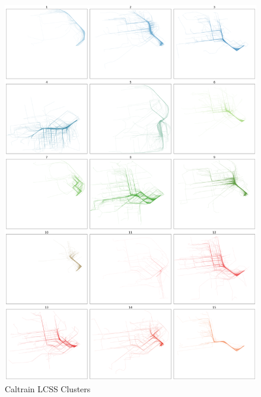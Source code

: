 \documentclass[a4paper, 12pt]{article}
\begin{document}
\begin{figure}[htbp!]
    \centering
    \includegraphics[width=1\textwidth]{Caltrain LCSS.png}
    \caption{Caltrain LCSS Clusters}
    \label{fig41}
\end{figure}
\end{document}
